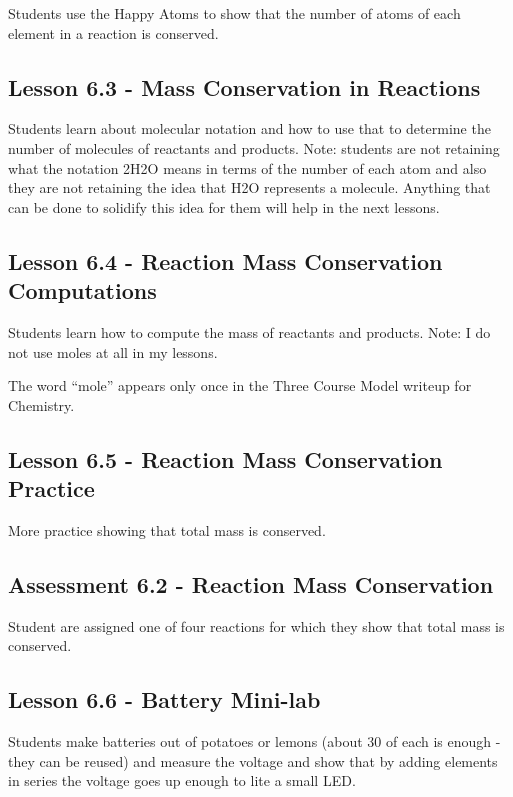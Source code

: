 \documentclass[12pt]{article}
\begin{document}
Students use the Happy Atoms to show that the number of atoms of each element in a reaction is conserved.

\subsection{Lesson 6.3 - Mass Conservation in Reactions} 

Students learn about molecular notation and how to use that to determine the number of molecules of reactants and products. Note: students are not retaining what the notation 2H2O means in terms of the number of each atom and also they are not retaining the idea that H2O represents a molecule. Anything that can be done to solidify this idea for them will help in the
next lessons.

\subsection{Lesson 6.4 - Reaction Mass Conservation Computations} 

Students learn how to compute the mass of reactants and products. Note: I do not use moles at all in my lessons.

The word “mole” appears only once in the Three Course Model writeup for
Chemistry.

\subsection{Lesson 6.5 - Reaction Mass Conservation Practice} 

More practice showing that total mass is conserved.

\subsection*{Assessment 6.2 - Reaction Mass Conservation} 

Student are assigned one of four reactions for which they show that total mass is conserved.

\subsection{Lesson 6.6 - Battery Mini-lab}

Students make batteries out of potatoes or lemons (about 30 of each is enough - they can be reused) and measure the voltage and show that by adding elements in series the voltage goes up enough to lite a small LED.
\end{document}
